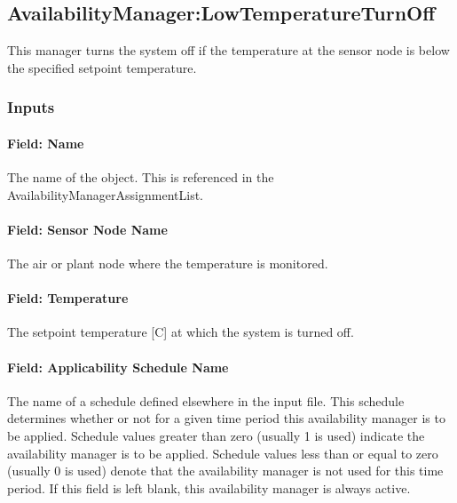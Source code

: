 \subsection{AvailabilityManager:LowTemperatureTurnOff}\label{availabilitymanagerlowtemperatureturnoff}

This manager turns the system off if the temperature at the sensor node is below the specified setpoint temperature.

\subsubsection{Inputs}\label{inputs-7-027}

\paragraph{Field: Name}\label{field-name-6-023}

The name of the object. This is referenced in the AvailabilityManagerAssignmentList.

\paragraph{Field: Sensor Node Name}\label{field-sensor-node-name-2}

The air or plant node where the temperature is monitored.

\paragraph{Field: Temperature}\label{field-temperature-2}

The setpoint temperature {[}C{]} at which the system is turned off.

\paragraph{Field: Applicability Schedule Name}\label{field-applicability-schedule-name}

The name of a schedule defined elsewhere in the input file. This schedule determines whether or not for a given time period this availability manager is to be applied. Schedule values greater than zero (usually 1 is used) indicate the availability manager is to be applied. Schedule values less than or equal to zero (usually 0 is used) denote that the availability manager is not used for this time period. If this field is left blank, this availability manager is always active.


